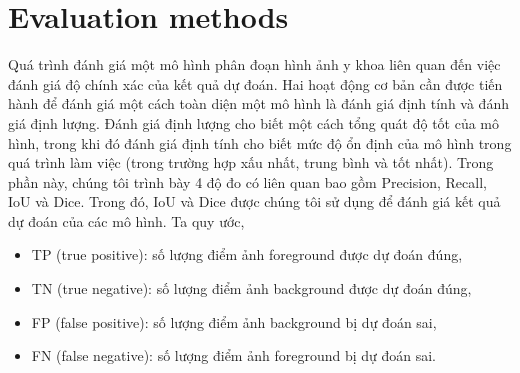\section{Evaluation methods} 
\label{sec:evaluation}
	Quá trình đánh giá một mô hình phân đoạn hình ảnh y khoa liên quan đến việc đánh giá độ chính xác của kết quả dự đoán. Hai hoạt động cơ bản cần được tiến hành để đánh giá một cách toàn diện một mô hình là đánh giá định tính và đánh giá định lượng. Đánh giá định lượng cho biết một cách tổng quát độ tốt của mô hình, trong khi đó đánh giá định tính cho biết mức độ ổn định của mô hình trong quá trình làm việc (trong trường hợp xấu nhất, trung bình và tốt nhất). Trong phần này, chúng tôi trình bày 4 độ đo có liên quan bao gồm Precision, Recall, IoU và Dice. Trong đó, IoU và Dice được chúng tôi sử dụng để đánh giá kết quả dự đoán của các mô hình.
\newpage
	Ta quy ước,
	\begin{itemize}
		\item TP (true positive): số lượng điểm ảnh foreground được dự đoán đúng,
		\item TN (true negative): số lượng điểm ảnh background được dự đoán đúng,
		\item FP (false positive): số lượng điểm ảnh background bị dự đoán sai,
		\item FN (false negative): số lượng điểm ảnh foreground bị dự đoán sai.
	\end{itemize}
